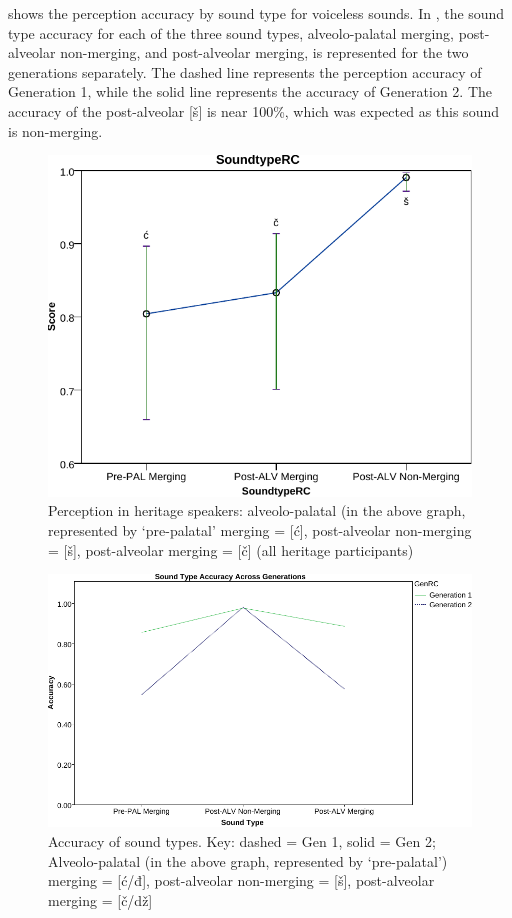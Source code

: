 \documentclass[output=paper,
modfonts,
newtxmath,
hidelinks,
]{langscibook}
\begin{document}
 shows the perception accuracy by sound type for voiceless sounds. In , the sound type accuracy for each of the three sound types, alveolo-palatal merging, post-alveolar non-merging, and post-alveolar merging, is represented for the two generations separately. The dashed line represents the perception accuracy of Generation 1, while the solid line represents the accuracy of Generation 2. The accuracy of the post-alveolar [š] is near 100\%, which was expected as this sound is non-merging.

\begin{figure}
\includegraphics[height=.3\textheight]{figures/MCfig6.pdf}
\caption{\label{fig:mihajlovic:6} Perception in heritage speakers: alveolo-palatal (in the above graph, represented by ‘pre-palatal’ merging = [ć], post-alveolar non-merging = [š], post-alveolar merging = [č] (all heritage participants)}
\end{figure}

\begin{figure}
\includegraphics[height=.3\textheight]{figures/MCfig7.pdf}
\caption{\label{fig:mihajlovic:7} Accuracy of sound types. Key: dashed = Gen 1, solid = Gen 2; Alveolo-palatal (in the above graph, represented by ‘pre-palatal’) merging = [ć/đ], post-alveolar non-merging = [š], post-alveolar merging = [č/dž]}
\end{figure}
\end{document}
